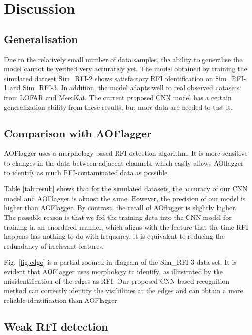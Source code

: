 \documentclass[usenatbib]{mnras}
\begin{document}
\section{Discussion}
\label{5}
\subsection{Generalisation}

Due to the relatively small number of data samples, the ability to generalise the model cannot be verified very accurately yet. The model obtained by training the simulated dataset Sim\_RFI-2 shows satisfactory RFI identification on Sim\_RFI-1 and Sim\_RFI-3. In addition, the model adapts well to real observed datasets from LOFAR and MeerKat.
The current proposed CNN model has a certain generalization ability from these results, but more data are needed to test it.

\subsection{Comparison with AOFlagger}
AOFlagger uses a morphology-based RFI detection algorithm. It is more sensitive to changes in the data between adjacent channels, which easily allows AOflagger to identify as much RFI-contaminated data as possible.

Table \ref{tab:result} shows that for the simulated datasets, the accuracy of our CNN model and AOFlagger is almost the same. However, the precision of our model is higher than AOFlagger. By contrast, the recall of AOflagger is slightly higher. The possible reason is that we fed the training data into the CNN model for training in an unordered manner, which aligns with the feature that the time RFI happens has nothing to do with frequency. It is equivalent to reducing the redundancy of irrelevant features. 

Fig.~\ref{fig:edge} is a partial zoomed-in diagram of the Sim\_RFI-3 data set. It is evident that AOFlagger uses morphology to identify, as illustrated by the misidentification of the edges as RFI. Our proposed CNN-based recognition method can correctly identify the visibilities at the edges and can obtain a more reliable identification than AOFlagger.



\subsection{Weak RFI detection}
\end{document}
